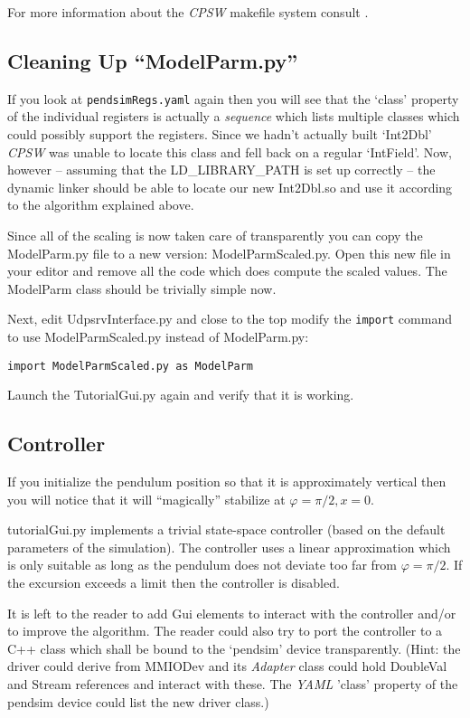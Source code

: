 \documentclass[10pt]{article}
\newcommand{\ita}[1]{\emph{#1}}
\newcommand{\cpsw}      {\ita {CPSW}}
\newcommand{\yaml}      {\ita {YAML}}
\newcommand{\cpp}       {C++}
\newcommand{\cod}[1] {{\tt#1}}
\begin{document}
For more information about the \cpsw{} makefile system consult \cite{makefile, INSTALL}.

\subsection{Cleaning Up ``ModelParm.py''}
If you look at \cod{pendsimRegs.yaml} again then you will see that the `class' property
of the individual registers is actually a {\em sequence} which lists multiple classes 
which could possibly support the registers.
Since we hadn't actually built `Int2Dbl' \cpsw{} was unable to locate this class and
fell back on a regular `IntField'. Now, however -- assuming that the LD\_LIBRARY\_PATH
is set up correctly -- the dynamic linker should be able to locate our new Int2Dbl.so
and use it according to the algorithm explained above.

Since all of the scaling is now taken care of transparently you can copy the 
ModelParm.py file to a new version: ModelParmScaled.py. Open this new file in your
editor and remove all the code which does compute the scaled values.
The ModelParm class should be trivially simple now.

Next, edit UdpsrvInterface.py and close to the top modify the \cod{import} 
command to use ModelParmScaled.py instead of ModelParm.py:
\begin{verbatim}
import ModelParmScaled.py as ModelParm
\end{verbatim}
Launch the TutorialGui.py again and verify that it is working.

\subsection{Controller}
If you initialize the pendulum position so that it is approximately vertical
then you will notice that it will ``magically'' stabilize at $\varphi=\pi/2, x=0$.

tutorialGui.py implements a trivial state-space controller (based on the
default parameters of the simulation). The controller uses a linear approximation
which is only suitable as long as the pendulum does not deviate too far
from $\varphi=\pi/2$. If the excursion exceeds a limit then the controller
is disabled.

It is left to the reader to add Gui elements to interact with the controller
and/or to improve the algorithm. The reader could also try to port the controller
to a \cpp{} class which shall be bound to the `pendsim' device transparently.
(Hint: the driver could derive from MMIODev and its {\em Adapter} class
could hold DoubleVal and Stream references and interact with these. The 
\yaml{} 'class' property of the pendsim device could list the new driver
class.)
\end{document}
